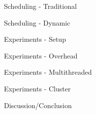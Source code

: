 \documentclass[pdf,colorBG,slideColor]{prosper}
\begin{document}
\begin{slide}{Scheduling - Traditional}
\end{slide}

\begin{slide}{Scheduling - Dynamic}
\end{slide}


\begin{slide}{Experiments - Setup}
\end{slide}

\begin{slide}{Experiments - Overhead}
\end{slide}

\begin{slide}{Experiments - Multithreaded}
\end{slide}

\begin{slide}{Experiments - Cluster}
\end{slide}

\begin{slide}{Discussion/Conclusion}
\end{slide}
\end{document}
